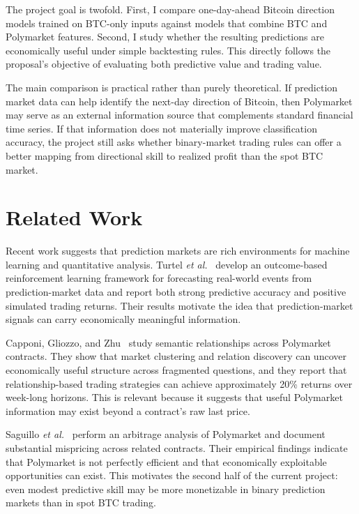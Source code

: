 \documentclass[conference]{IEEEtran}
\begin{document}
The project goal is twofold. First, I compare one-day-ahead Bitcoin direction models trained on BTC-only inputs against models that combine BTC and Polymarket features. Second, I study whether the resulting predictions are economically useful under simple backtesting rules. This directly follows the proposal's objective of evaluating both predictive value and trading value.

The main comparison is practical rather than purely theoretical. If prediction market data can help identify the next-day direction of Bitcoin, then Polymarket may serve as an external information source that complements standard financial time series. If that information does not materially improve classification accuracy, the project still asks whether binary-market trading rules can offer a better mapping from directional skill to realized profit than the spot BTC market.

\section{Related Work}
Recent work suggests that prediction markets are rich environments for machine learning and quantitative analysis. Turtel \emph{et al.}~\cite{turtel} develop an outcome-based reinforcement learning framework for forecasting real-world events from prediction-market data and report both strong predictive accuracy and positive simulated trading returns. Their results motivate the idea that prediction-market signals can carry economically meaningful information.

Capponi, Gliozzo, and Zhu~\cite{capponi} study semantic relationships across Polymarket contracts. They show that market clustering and relation discovery can uncover economically useful structure across fragmented questions, and they report that relationship-based trading strategies can achieve approximately 20\% returns over week-long horizons. This is relevant because it suggests that useful Polymarket information may exist beyond a contract's raw last price.

Saguillo \emph{et al.}~\cite{saguillo} perform an arbitrage analysis of Polymarket and document substantial mispricing across related contracts. Their empirical findings indicate that Polymarket is not perfectly efficient and that economically exploitable opportunities can exist. This motivates the second half of the current project: even modest predictive skill may be more monetizable in binary prediction markets than in spot BTC trading.
\end{document}
